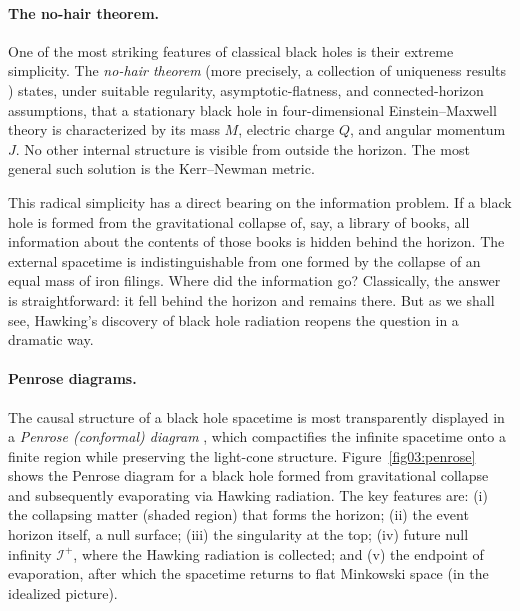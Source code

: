 \documentclass[11pt,letterpaper]{article}
\theoremstyle{plain}
\theoremstyle{definition}
\theoremstyle{remark}
\begin{document}
\paragraph{The no-hair theorem.}
One of the most striking features of classical black holes is their
extreme simplicity.  The \emph{no-hair theorem} (more precisely, a
collection of uniqueness results \cite{israel1967,israel1968,carter1971})
states, under suitable regularity, asymptotic-flatness, and connected-horizon
assumptions, that a stationary black hole in four-dimensional
Einstein--Maxwell theory is characterized by
its mass $M$, electric charge $Q$, and angular momentum $J$.
No other internal structure is visible from outside the horizon.  The
most general such solution is the Kerr--Newman metric.

This radical simplicity has a direct bearing on the information problem.
If a black hole is formed from the gravitational collapse of, say, a
library of books, all information about the contents of those books is
hidden behind the horizon.  The external spacetime is indistinguishable
from one formed by the collapse of an equal mass of iron filings.  Where
did the information go?  Classically, the answer is straightforward:
it fell behind the horizon and remains there.  But as we shall see,
Hawking's discovery of black hole radiation reopens the question in a
dramatic way.

\paragraph{Penrose diagrams.}
The causal structure of a black hole spacetime is most transparently
displayed in a \emph{Penrose (conformal) diagram} \cite{penrose1963},
which compactifies the infinite spacetime onto a finite region while
preserving the light-cone structure.  Figure~\ref{fig03:penrose} shows the Penrose
diagram for a black hole formed from gravitational collapse and
subsequently evaporating via Hawking radiation.  The key features are:
(i) the collapsing matter (shaded region) that forms the horizon;
(ii) the event horizon itself, a null surface;
(iii) the singularity at the top;
(iv) future null infinity $\mathscr{I}^{+}$, where the Hawking radiation
is collected; and (v) the endpoint of evaporation, after which the
spacetime returns to flat Minkowski space (in the idealized picture).
\end{document}

